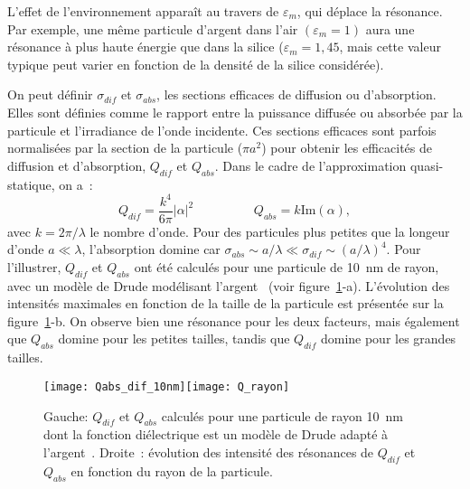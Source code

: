 L'effet de l'environnement apparaît au travers de $\varepsilon_m$, qui déplace la résonance. Par exemple, une même particule d'argent dans l'air $(\varepsilon_m = 1)$ aura une résonance à plus haute énergie que dans la silice ($\varepsilon_m = 1,45$, mais cette valeur typique peut varier en fonction de la densité de la silice considérée).\par  
On peut définir $\sigma_{dif}$ et $\sigma_{abs}$, les sections efficaces de diffusion ou d'absorption. Elles sont définies comme le rapport entre la puissance diffusée  ou absorbée par la particule et l'irradiance de l'onde incidente. Ces sections efficaces sont parfois normalisées par la section de la particule ($\pi a^2$) pour obtenir les efficacités de diffusion et d'absorption, $Q_{dif}$ et $Q_{abs}$. Dans le cadre de l'approximation quasi-statique, on a~:
\begin{equation}
Q_{dif}=\dfrac{k^4}{6\pi}|\alpha|^2 \hspace{2cm} Q_{abs} = k \mathrm{Im}(\alpha),
\end{equation}
avec $k=2\pi/\lambda$ le nombre d'onde. Pour des particules plus petites que la longeur d'onde $ a \ll \lambda$, l'absorption domine car $\sigma_{abs} \sim a/\lambda  \ll \sigma_{dif} \sim (a/\lambda)^4$. Pour l'illustrer, $Q_{dif}$ et $Q_{abs}$ ont été calculés pour une particule de 10~nm de rayon, avec un modèle de Drude modélisant l'argent~\cite{yang2015optical} (voir figure~\ref{QvsSize}-a). L'évolution des intensités maximales en fonction de la taille de la particule est présentée sur la figure~\ref{QvsSize}-b. On observe bien une résonance pour les deux facteurs, mais également que $Q_{abs}$ domine pour les petites tailles, tandis que $Q_{dif}$ domine pour les grandes tailles. \par 
\begin{figure}[!htb]
	\centering
	\texttt{[image: Qabs\_dif\_10nm]}\texttt{[image: Q\_rayon]}
	\caption{Gauche: $Q_{dif}$ et $Q_{abs}$ calculés pour une particule de rayon 10~nm dont la fonction diélectrique est un modèle de Drude adapté à l'argent~\cite{yang2015optical}. Droite~: évolution des intensité des résonances de $Q_{dif}$ et $Q_{abs}$ en fonction du rayon de la particule.}
	\label{QvsSize}
\end{figure}

